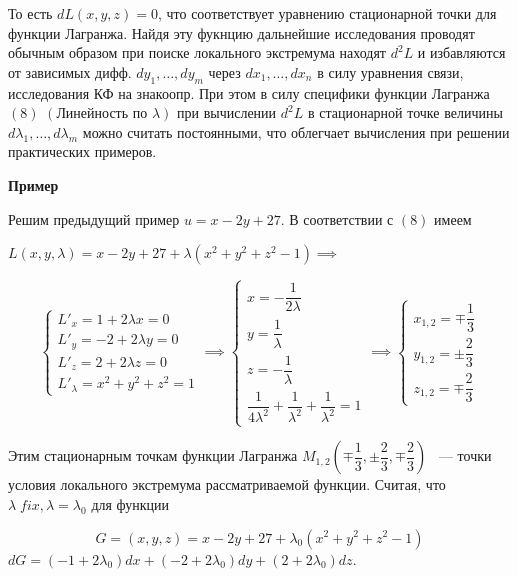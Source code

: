 \documentclass[../../main.tex]{subfiles}
\begin{document}
	То есть $dL\left( x, y, z \right) = 0$, что соответствует уравнению 
	стационарной точки для функции Лагранжа. Найдя эту фукнцию дальнейшие
	исследования проводят обычным образом при поиске локального экстремума 
	находят $d^2L$ и избавляются от зависимых дифф. $d y_1, \ldots, d y_m $ 
	через $d x_1, \ldots, d x_n$ в силу уравнения связи, исследования КФ на 
	знакоопр. При этом в силу специфики функции Лагранжа $\left( 8 \right)$ 
	$\left( \text{Линейность по } \lambda \right) $ при вычислении $d^2 L$
	в стационарной точке величины $d \lambda_1, \ldots, d \lambda_m$ можно
	считать постоянными, что облегчает вычисления при решении практических
	примеров.
	
	\textbf{Пример}
	
	Решим предыдущий пример $u = x - 2y + 27$. В 
	соответствии с $\left( 8 \right)$ 
	имеем 
	
	$L \left( x, y, \lambda \right) = x - 2y + 27 + \lambda \left( x^2 + y^2 
	+ z^2 - 1 \right) \implies$ 
	
	\begin{equation}
	\begin{cases}
	L'_x = 1 + 2 \lambda x = 0 \\
	L'_y = -2 + 2 \lambda y = 0 \\
	L'_z = 2 + 2 \lambda z = 0 \\
	L'_\lambda = x^2 + y^2 + z^2 = 1
	\end{cases} \implies
	\begin{cases}
	x = -\dfrac{1}{2\lambda} \\
	y = \dfrac{1}{\lambda} \\
	z = -\dfrac{1}{\lambda} \\
	\dfrac{1}{4\lambda^2} + \dfrac{1}{\lambda^2} + \dfrac{1}{\lambda^2} = 1
	\end{cases} \implies
	\begin{cases}
	x_{1, 2} = \mp \dfrac{1}{3} \\
	y_{1, 2} = \pm \dfrac{2}{3} \\
	z_{1, 2} = \mp \dfrac{2}{3} 
	\end{cases}
	\end{equation}
	
	Этим стационарным точкам функции Лагранжа $M_{1, 2} \left( \mp \dfrac{1}{3}, 
	\pm \dfrac{2}{3}, \mp \dfrac{2}{3} \right) $ ~--- точки условия локального
	экстремума рассматриваемой функции. Считая, что $\lambda\; fix, 
	\lambda = \lambda_0$ для функции
	
	\[G = \left( x, y, z \right) = x - 2y + 27 + 
	\lambda_0\left( x^2 + y^2 + z^2 - 1 \right)\]
	$
	dG = \left( -1 + 2 \lambda_0 \right)dx + \left( -2 + 2\lambda_0 \right)dy 
	+ \left( 2 + 2 \lambda_0 \right) dz $.
	\smallskip
	
\end{document}
